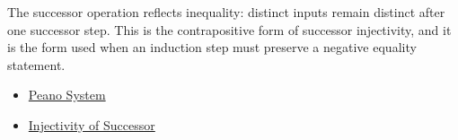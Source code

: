 \begin{remark*}[Interpretation]
The successor operation reflects inequality: distinct inputs remain distinct
after one successor step. This is the contrapositive form of successor
injectivity, and it is the form used when an induction step must preserve a
negative equality statement.
\end{remark*}

\begin{dependencies}
\begin{itemize}
  \item \hyperref[def:peano-system]{Peano System}
  \item \hyperref[ax:peano-successor-injective]{Injectivity of Successor}
\end{itemize}
\end{dependencies}

